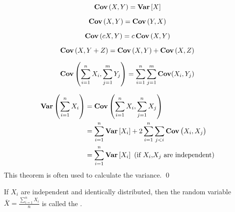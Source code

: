 \begin{theorem}
    \begin{equation}
        \mathop{\bf Cov\/}\left(X,Y \right) = \mathop{\bf Var\/}\left[ X \right]
    \end{equation}    
\end{theorem}

\begin{theorem}
    \begin{equation}
        \mathop{\bf Cov\/}\left(X,Y \right) = \mathop{\bf Cov\/}\left(Y,X \right)
    \end{equation}    
\end{theorem}

\begin{theorem}
    \begin{equation}
        \mathop{\bf Cov\/}\left(cX,Y \right) = c \mathop{\bf Cov\/}\left(X,Y \right)
    \end{equation}    
\end{theorem}

\begin{theorem}
    \begin{equation}
        \mathop{\bf Cov\/}\left(X,Y + Z \right) = \mathop{\bf Cov\/}\left(X,Y \right) + \mathop{\bf Cov\/}\left(X,Z \right)
    \end{equation}    
\end{theorem}

\begin{theorem}
    \begin{equation}
        \mathop{\bf Cov\/} \left(\sum_{i=1}^n X_i, \sum_{j=1}^m Y_j \right) = \sum_{i=1}^n \sum_{j=1}^m \mathop{\bf Cov\/}(X_i, Y_j)
    \end{equation}    
\end{theorem}

\begin{theorem}
    \begin{equation}
    \begin{aligned}
        \mathop{\bf Var\/} \left( \sum_{i=1}^n X_i \right) &= \mathop{\bf Cov\/}\left( \sum_{i=1}^n X_i, \sum_{j=1}^n X_j \right) \\
        &= \sum_{i=1}^n \mathop{\bf Var\/}\left[ X_i \right] + 2 \sum_{i=1}^n \sum_{j < i} \mathop{\bf Cov\/}\left(X_i,X_j \right) \\
        &= \sum_{i=1}^n \mathop{\bf Var\/}\left[ X_i \right] \text{ (if } X_i \text{,} X_j \text{ are independent)}
    \end{aligned}
    \end{equation}
    This theorem is often used to calculate the variance. \qed
\end{theorem}

\begin{definition}
    If $X_i$ are independent and identically distributed, then the random variable $\bar{X} =\displaystyle \frac{\sum_{i=1}^n X_i}{n}$ is called the .
\end{definition}

